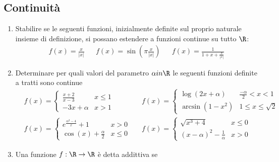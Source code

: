 \subsection{Continuità}
\begin{enumerate}
	\item Stabilire se le seguenti funzioni, inizialmente definite sul proprio naturale insieme di definizione, si possano estendere a funzioni continue su tutto $ \R  $:
	      \begin{align*}
		      f\left(x\right) = \frac{x}{\left|x\right|} &  & f\left(x\right) = \sin \left(\pi \frac{x}{\left|x\right|}\right) &  & f\left(x\right) = \frac{1}{1 + x + \frac{x}{\left|x\right|}}
	      \end{align*}
	\item Determinare per quali valori del parametro $ \alpha  in \R  $ le seguenti funzioni definite a tratti sono continue
	      \begin{align*}
		       &
		      f\left(x\right) = \begin{cases}
			                        \frac{x+2}{x-3} & x \le 1 \\
			                        -3x + \alpha    & x >1
		                        \end{cases}
		       &   &
		      f(x) = \begin{cases}
			             \log \left(2x + \alpha \right) & \frac{-\alpha}{2} < x < 1 \\
			             \arcsin \left(1 - x^2 \right)  & 1 \le  x \le  \sqrt{2}
		             \end{cases}                   \\
		       &
		      f\left(x\right) = \begin{cases}
			                        e^{\frac{\alpha^2 -4}{x}} + 1          & x > 0    \\
			                        \cos \left(x\right) + \frac{\alpha}{2} & x \le  0
		                        \end{cases}
		       &   & f\left(x\right) = \begin{cases}
			                               \sqrt{x^3  + 4}                                 & x \le  0 \\
			                               \left(x - \alpha \right)^2  - \frac{1}{\alpha } & x > 0
		                               \end{cases}
	      \end{align*}
	\item Una funzione $ f: \R  \to  \R  $ è detta addittiva se

\end{enumerate}
